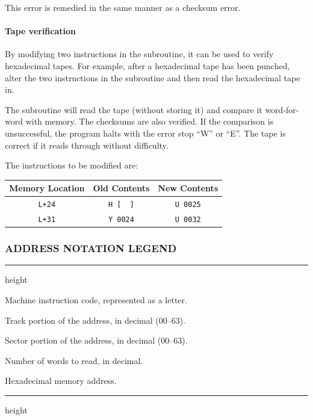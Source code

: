 This error is remedied in the same manner as a checksum error.

\paragraph{Tape verification}
By modifying two instructions in the subroutine, it can be used to verify hexadecimal tapes. For example, after a hexadecimal tape has been punched, alter the two instructions in the subroutine and then read the hexadecimal tape in.

The subroutine will read the tape (without storing it) and compare it word-for-word with memory. The checksums are also verified. If the comparison is unsuccessful, the program halts with the error stop ``W'' or ``E''. The tape is correct if it reads through without difficulty.

The instructions to be modified are:

\begin{table}[h!]
\centering
\begin{tabular}{ccc}
\toprule
\textbf{Memory Location} & \textbf{Old Contents} & \textbf{New Contents} \\
\midrule
\texttt{L+24} & \texttt{H [\ \ ]} & \texttt{U 0025} \\
\texttt{L+31} & \texttt{Y 0024} & \texttt{U 0032} \\
\bottomrule
\end{tabular}
\end{table}

\subsubsection*{ADDRESS NOTATION LEGEND}

\noindent
\hrule height \heavyrulewidth
\nopagebreak
\begin{description}[leftmargin=2.0em, itemsep=3pt, topsep=4pt, parsep=0pt, partopsep=0pt]
    \item[\texttt{Ø}] Machine instruction code, represented as a letter.
    \item[\texttt{TT}] Track portion of the address, in decimal (00--63).
    \item[\texttt{SS}] Sector portion of the address, in decimal (00--63).
    \item[\texttt{NN}] Number of words to read, in decimal.
    \item[\texttt{HHHH}] Hexadecimal memory address.
\end{description}
\nopagebreak
\hrule height \heavyrulewidth


